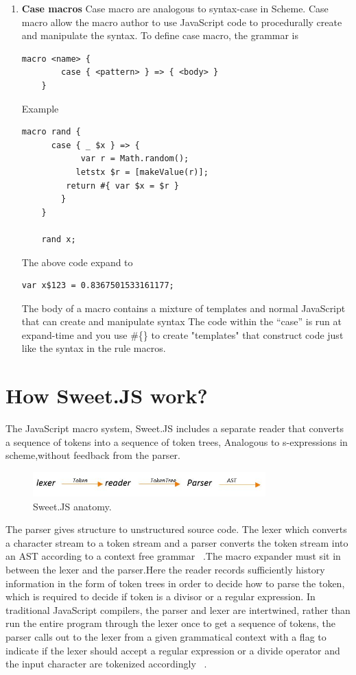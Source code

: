 \begin{enumerate}
\item {\bf Case macros }
Case macro are analogous to syntax-case in Scheme. Case macro allow the macro author to use JavaScript code to procedurally create and manipulate the syntax.
To define case macro, the grammar is
\begin{lstlisting}[frame=single]
	macro <name> {
  		case { <pattern> } => { <body> }
	}
\end{lstlisting}
Example
\begin{lstlisting}[frame=single]
	macro rand {
  	  case { _ $x } => {
    	    var r = Math.random();
     	   letstx $r = [makeValue(r)];
      	 return #{ var $x = $r }
   		}
	}

	rand x;
\end{lstlisting}

The above code expand to

\begin{lstlisting}[frame=single]
	var x$123 = 0.8367501533161177;
\end{lstlisting}

The body of a macro contains a mixture of templates and normal JavaScript that can create and manipulate syntax
The code within the ``case'' is run at expand-time and you use \#\{\} to create "templates" that construct code just like the syntax in the rule macros.

\end{enumerate}

\section{How Sweet.JS work?}

The JavaScript macro system, Sweet.JS includes a separate reader that converts a sequence of tokens into a sequence of token trees, Analogous to s-expressions in scheme,without feedback from the parser.

\begin{figure}[htb]
\centering
\includegraphics[width=0.8\textwidth]{images/Tokenizer.jpg}
\caption{Sweet.JS anatomy.} 
\label{fig:Tokenizer}
\end{figure}

The parser gives structure to unstructured source code. The lexer which converts a character stream to a token stream and a parser converts the token stream into an AST according to a context free grammar ~\cite{bib2}.The macro expander  must sit in between the lexer and the parser.Here the reader records sufficiently history information in the form of token trees in order to decide how to parse the token, which is required to decide if token is a divisor or a regular expression.
In traditional JavaScript compilers, the parser and lexer are intertwined, rather than run the entire program through the lexer once to get a sequence of tokens, the parser calls out to the lexer from a given grammatical context with a flag to indicate if the lexer should accept a regular expression or a divide operator and the input character are tokenized accordingly ~\cite{bib2}.

